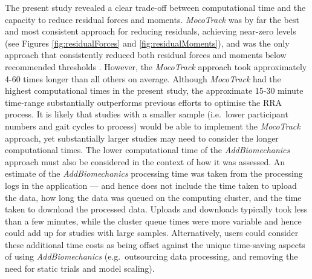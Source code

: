 \documentclass[]{elsarticle} %
\begin{document}
The present study revealed a clear trade-off between computational time
and the capacity to reduce residual forces and moments. \emph{MocoTrack}
was by far the best and most consistent approach for reducing residuals,
achieving near-zero levels (see Figures \ref{fig:residualForces} and
\ref{fig:residualMoments}), and was the only approach that consistently
reduced both residual forces and moments below recommended thresholds
\citep{Hicks2015}. However, the \emph{MocoTrack} approach took
approximately 4-60 times longer than all others on average. Although
\emph{MocoTrack} had the highest computational times in the present
study, the approximate 15-30 minute time-range substantially outperforms
previous efforts \citep{Samaan2016, Sturdy2022} to optimise the RRA
process. It is likely that studies with a smaller sample (i.e.~lower
participant numbers and gait cycles to process) would be able to
implement the \emph{MocoTrack} approach, yet substantially larger
studies may need to consider the longer computational times. The lower
computational time of the \emph{AddBiomechanics} approach must also be
considered in the context of how it was assessed. An estimate of the
\emph{AddBiomechanics} processing time was taken from the processing
logs in the application --- and hence does not include the time taken to
upload the data, how long the data was queued on the computing cluster,
and the time taken to download the processed data. Uploads and downloads
typically took less than a few minutes, while the cluster queue times
were more variable and hence could add up for studies with large
samples. Alternatively, users could consider these additional time costs
as being offset against the unique time-saving aspects of using
\emph{AddBiomechanics} (e.g.~outsourcing data processing, and removing
the need for static trials and model scaling).

~
\end{document}
